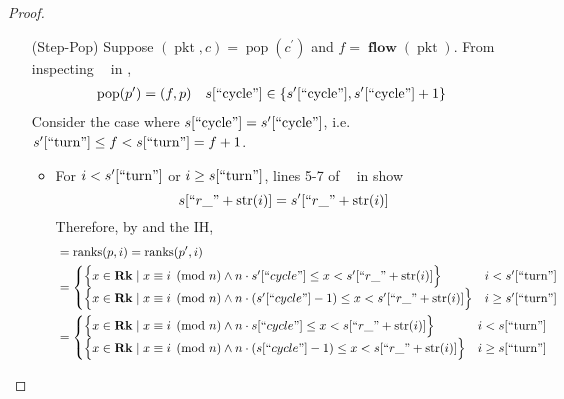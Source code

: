 \documentclass{amsart}
\DeclareMathOperator{\pkt}{\mathrm{pkt}}
\DeclareMathOperator{\pop}{\mathrm{pop}}
\DeclareMathOperator{\Rk}{\mathbf{Rk}}
\DeclareMathOperator{\flow}{\mathbf{flow}}
\DeclareMathOperator{\zpostpop}{z_{\mathrm{post-pop}}}
\DeclareMathOperator{\ranks}{\mathrm{ranks}}
\theoremstyle{definition}
\begin{document}
\begin{proof}
\begin{enumerate}
\begin{enumerate}
                \item[(Step-Pop)] Suppose $(\pkt, c) = \pop(c^\prime)$ and $f = \flow(\pkt)$. 
                    From inspecting $\zpostpop$ in ,
                    \begin{align*}
                        \pop(p^\prime) = (f, p) %
                        &&
                        s[``\text{cycle}"] \in \{s^\prime[``\text{cycle}"], s^\prime[``\text{cycle}"] + 1\}
                    \end{align*}
                    Consider the case where $s[``\text{cycle}"] = s^\prime[``\text{cycle}"]$, i.e. $s^\prime[``\text{turn}"] \leq f < s[``\text{turn}"] = f + 1$.
                    \begin{itemize}
                        \item For $i < s^\prime[``\text{turn}"]$ or $i \geq s[``\text{turn}"]$, lines 5-7 of $\zpostpop$ in  show
                            $$s[``r\_" + \mathrm{str}(i)] = s^\prime[``r\_" + \mathrm{str}(i)]$$
                            Therefore, by  and the IH,
                            \begin{align*}
                                &= \ranks(p, i) = \ranks(p^\prime, i)\\
                                &=
                                    \begin{cases}
                                        \Big\{x \in \Rk \mid x \equiv i \pmod n \land n \cdot s^\prime[``cycle"] \leq x < s^\prime[``r\_" + \mathrm{str}(i)] \Big\} 
                                        & i < s^\prime[``\text{turn}"]\\
                                        \Big\{x \in \Rk \mid x \equiv i \pmod n \land n \cdot (s^\prime[``cycle"] - 1) \leq x < s^\prime[``r\_" + \mathrm{str}(i)]\Big\} 
                                        & i \geq s^\prime[``\text{turn}"]
                                    \end{cases}\\
                                &=
                                    \begin{cases}
                                        \Big\{x \in \Rk \mid x \equiv i \pmod n \land n \cdot s[``cycle"] \leq x < s[``r\_" + \mathrm{str}(i)] \Big\} 
                                        & i < s[``\text{turn}"]\\
                                        \Big\{x \in \Rk \mid x \equiv i \pmod n \land n \cdot (s[``cycle"] - 1) \leq x < s[``r\_" + \mathrm{str}(i)]\Big\} 
                                        & i \geq s[``\text{turn}"]
                                    \end{cases}
                            \end{align*}


\end{itemize}
\end{enumerate}
\end{enumerate}
\end{proof}
\end{document}

